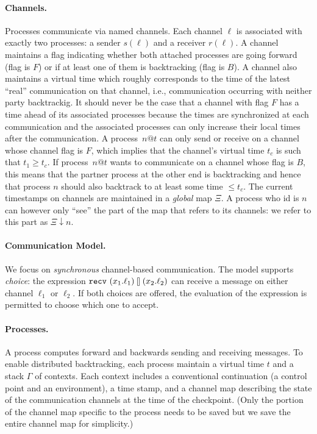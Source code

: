 \documentclass{article}
\begin{document}
\paragraph*{Channels.} Processes communicate via named channels. Each channel
$\ell$ is associated with exactly two processes: a sender $s(\ell)$ and a
receiver $r(\ell)$. A channel maintains a flag indicating whether both
attached processes are going forward (flag is $F$) or if at least one of them
is backtracking (flag is $B$). A channel also maintains a virtual time which
roughly corresponds to the time of the latest ``real'' communication on that
channel, i.e., communication occurring with neither party backtrackig. It
should never be the case that a channel with flag $F$ has a time ahead of its
associated processes because the times are synchronized at each communication
and the associated processes can only increase their local times after the
communication. A process~$n@t$ can only send or receive on a channel whose
channel flag is $F$, which implies that the channel's virtual time $t_c$ is
such that $t_1 \geq t_c$. If process~$n@t$ wants to communicate on a channel
whose flag is $B$, this means that the partner process at the other end is
backtracking and hence that process $n$ should also backtrack to at least
some time $\leq t_c$. The current timestamps on channels are maintained in a
\emph{global} map $\Xi$. A process who id is $n$ can however only ``see'' the
part of the map that refers to its channels: we refer to this part as
$\Xi\downarrow n$.

\paragraph*{Communication Model.} We focus on \emph{synchronous}
channel-based communication. The model supports \emph{choice}: the expression
$\texttt{recv}~(x_1.\ell_1) \talloblong (x_2.\ell_2)$ can receive a message on either channel
$\ell_1$ or $\ell_2$. If both choices are offered, the evaluation of the
expression is permitted to choose which one to accept. 

\paragraph*{Processes.} A process computes forward and backwards sending and
receiving messages. To enable distributed backtracking, each process maintain
a virtual time $t$ and a stack $\Gamma$ of contexts. Each context includes a
conventional continuation (a control point and an environment), a time stamp,
and a channel map describing the state of the communication channels at the
time of the checkpoint. (Only the portion of the channel map specific to the
process needs to be saved but we save the entire channel map for simplicity.)
\end{document}
